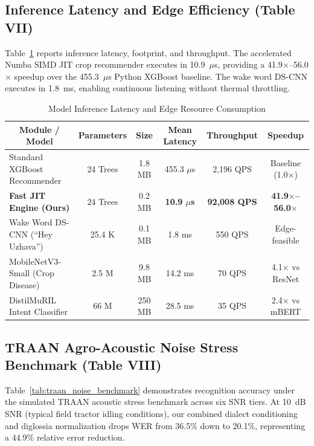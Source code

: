 \documentclass[conference]{IEEEtran}
\begin{document}
\subsection{Inference Latency and Edge Efficiency (Table VII)}
Table~\ref{tab:inference_latency} reports inference latency, footprint, and throughput. The accelerated Numba SIMD JIT crop recommender executes in 10.9~$\mu$s, providing a 41.9$\times$--56.0$\times$ speedup over the 455.3~$\mu$s Python XGBoost baseline. The wake word DS-CNN executes in 1.8~ms, enabling continuous listening without thermal throttling.

\begin{table}[t]
\centering
\caption{Model Inference Latency and Edge Resource Consumption}
\label{tab:inference_latency}
\begin{tabular}{|l|c|c|c|c|c|}
\hline
\multicolumn{1}{|c|}{\textbf{Module / Model}} & \textbf{Parameters} & \textbf{Size} & \textbf{Mean Latency} & \textbf{Throughput} & \textbf{Speedup} \\
\hline
Standard XGBoost Recommender      & 24 Trees & 1.8 MB  & 455.3 $\mu$s & 2,196 QPS   & Baseline (1.0$\times$) \\
\hline
\textbf{Fast JIT Engine (Ours)}   & 24 Trees & 0.2 MB  & \textbf{10.9 $\mu$s} & \textbf{92,008 QPS} & \textbf{41.9$\times$--56.0$\times$} \\
\hline
Wake Word DS-CNN (``Hey Uzhava'') & 25.4 K   & 0.1 MB  & 1.8 ms       & 550 QPS     & Edge-feasible \\
\hline
MobileNetV3-Small (Crop Disease)  & 2.5 M    & 9.8 MB  & 14.2 ms      & 70 QPS      & 4.1$\times$ vs ResNet \\
\hline
DistilMuRIL Intent Classifier     & 66 M     & 250 MB  & 28.5 ms      & 35 QPS      & 2.4$\times$ vs mBERT \\
\hline
\end{tabular}
\end{table}

\subsection{TRAAN Agro-Acoustic Noise Stress Benchmark (Table VIII)}
Table~\ref{tab:traan_noise_benchmark} demonstrates recognition accuracy under the simulated TRAAN acoustic stress benchmark across six SNR tiers. At 10~dB SNR (typical field tractor idling conditions), our combined dialect conditioning and diglossia normalization drops WER from 36.5\% down to 20.1\%, representing a 44.9\% relative error reduction.
\end{document}

